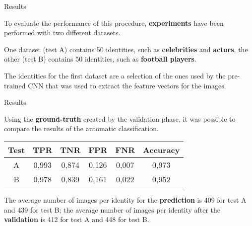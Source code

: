 \begin{tframe}{Results}

To evaluate the performance of this procedure, \textbf{experiments} have been performed with two different datasets.

\vspace{0.1in}

One dataset (test A) contains 50 identities, such as \textbf{celebrities} and \textbf{actors}, the other (test B) contains 50 identities, such as \textbf{football players}. 

\vspace{0.1in}

The identities for the first dataset are a selection of the ones used by the pre-trained CNN that was used to extract the feature vectors for the images.

\end{tframe}


\begin{tframe}{Results}

Using the \textbf{ground-truth} created by the validation phase, it was possible to compare the results of the automatic classification.

\begin{table}[ht]
\centering %
\begin{tabular}{c c c c c c} %
\hline\hline %
Test & TPR & TNR & FPR & FNR & Accuracy \\ [0.5ex] %
\hline %
A & 0,993 & 0,874 & 0,126 & 0,007 & 0,973 \\
B & 0,978 & 0,839 & 0,161 & 0,022 & 0,952 \\ [1ex] %
\hline %
\end{tabular}
\label{table:nonlin} %
\end{table}

\vspace{0.1in}

The average number of images per identity for the \textbf{prediction} is 409 for test A and 439 for test B; the average number of images per identity after the \textbf{validation} is 412 for test A and 448 for test B.

\end{tframe}